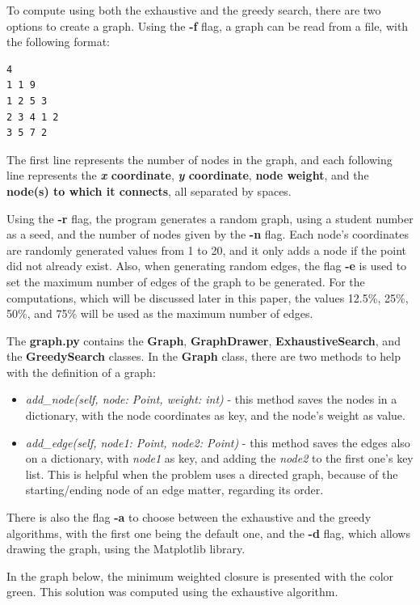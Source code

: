 \documentclass[...]{revdetua}
\begin{document}
To compute using both the exhaustive and the greedy search, there are two options to create a graph. Using the \textbf{-f} flag, a graph can be read from a file, with the following format:
\begin{verbatim}
4
1 1 9
1 2 5 3
2 3 4 1 2
3 5 7 2
\end{verbatim}

The first line represents the number of nodes in the graph, and each following line represents the \textbf{\textit{x} coordinate}, \textbf{\textit{y} coordinate}, \textbf{node weight}, and the \textbf{node(s) to which it connects}, all separated by spaces.

Using the \textbf{-r} flag, the program generates a random graph, using a student number as a seed, and the number of nodes given by the \textbf{-n} flag. Each node's coordinates are randomly generated values from 1 to 20, and it only adds a node if the point did not already exist. Also, when generating random edges, the flag \textbf{-e} is used to set the maximum number of edges of the graph to be generated. For the computations, which will be discussed later in this paper, the values 12.5\%, 25\%, 50\%, and 75\% will be used as the maximum number of edges.

The \textbf{graph.py} contains the \textbf{Graph}, \textbf{GraphDrawer}, \textbf{ExhaustiveSearch}, and the \textbf{GreedySearch} classes. In the \textbf{Graph} class, there are two methods to help with the definition of a graph:

\begin{itemize}
    \item \textit{add\_node(self, node: Point, weight: int)} - this method saves the nodes in a dictionary, with the node coordinates as key, and the node's weight as value.
    \item \textit{add\_edge(self, node1: Point, node2: Point)} - this method saves the edges also on a dictionary, with \textit{node1} as key, and adding the \textit{node2} to the first one's key list. This is helpful when the problem uses a directed graph, because of the starting/ending node of an edge matter, regarding its order.
\end{itemize}

There is also the flag \textbf{-a} to choose between the exhaustive and the greedy algorithms, with the first one being the default one, and the \textbf{-d} flag, which allows drawing the graph, using the Matplotlib\cite{matplotib} library.

In the graph below, the minimum weighted closure is presented with the color green. This solution was computed using the exhaustive algorithm.
\end{document}
